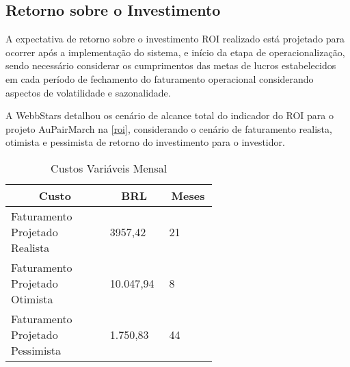 \subsection{Retorno sobre o Investimento}

A expectativa de retorno sobre o investimento \gls{ROI} realizado está projetado para ocorrer após a implementação do sistema, e início da etapa de operacionalização, sendo necessário considerar os cumprimentos das metas de lucros estabelecidos em cada período de fechamento do faturamento operacional considerando aspectos de volatilidade e sazonalidade.

A WebbStars detalhou os cenário de alcance total do indicador do \gls{ROI} para o projeto AuPairMarch na \autoref{roi}, considerando o cenário de faturamento realista, otimista e pessimista de retorno do investimento para o investidor.

\begin{enumerate}
    \begin{table}[H]
    \caption{Custos Variáveis Mensal}
    \label{roi}
    	\centering\footnotesize
        \begin{tabular}{|p{0.40\linewidth} | p{0.10\linewidth} | p{0.10\linewidth} |}  \hline
        \multicolumn{1}{|c|}{\textbf{Custo}} &
          \multicolumn{1}{c|}{\textbf{BRL}} &
         \multicolumn{1}{c|}{\textbf{Meses}}   \\ \hline

        Faturamento Projetado Realista & 3957,42 & 21          \\ \hline
        Faturamento Projetado Otimista & 10.047,94 &  8                \\ \hline
        Faturamento Projetado Pessimista & 1.750,83 &  44                           \\\hline

        \end{tabular}
    \end{table}
\end{enumerate}